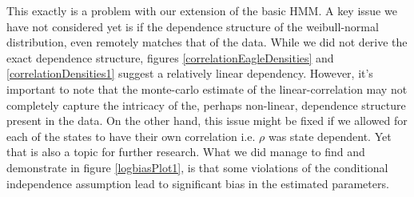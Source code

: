 This exactly is a problem with our extension of the basic HMM. A key issue we have not considered yet is if the dependence structure of the weibull-normal distribution, even remotely matches that of the data. While we did not derive the exact dependence structure, figures \ref{correlationEagleDensities} and \ref{correlationDensities1} suggest a relatively linear dependency. However, it's important to note that the monte-carlo estimate of the linear-correlation may not completely capture the intricacy of the, perhaps non-linear, dependence structure present in the data. On the other hand, this issue might be fixed if we allowed for each of the states to have their own correlation i.e. $\rho$ was state dependent. Yet that is also a topic for further research. What we did manage to find and demonstrate in figure \ref{logbiasPlot1}, is that some violations of the conditional independence assumption lead to significant bias in the estimated parameters.